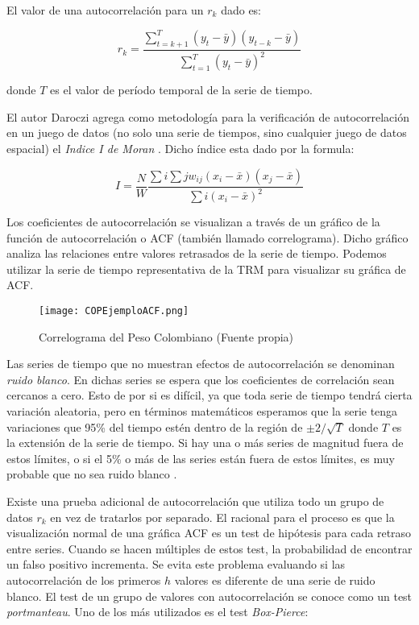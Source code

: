 El valor de una autocorrelación para un \(r_{k}\) dado es:

\[ r_{k} = \frac{\sum_{t = k + 1}^T(y_{t} - \bar{y})(y_{t - k} - \bar{y})}{\sum_{t = 1}^T(y_{t} - \bar{y})^{2}} \]

donde \(T\) es el valor de período temporal de la serie de tiempo. 

El autor Daroczi agrega como metodología para la verificación de autocorrelación en un juego de datos (no solo una serie de tiempos, sino cualquier juego de datos espacial) el \emph{Indice I de Moran} \cite{daroczi}. Dicho índice esta dado por la formula:

\[ I = \frac{N}{W} 
	\frac{\sum{i}\sum{j}w_{ij}(x_{i} - \bar{x})(x_{j} - \bar{x})}{{\sum{i}(x_{i} - \bar{x})^2}} \]

Los coeficientes de autocorrelación se visualizan a través de un gráfico de la función de autocorrelación o ACF (también llamado correlograma). Dicho gráfico analiza las relaciones entre valores retrasados de la serie de tiempo. Podemos utilizar la serie de tiempo representativa de la TRM para visualizar su gráfica de ACF.

\begin{figure}[h!]
    \centering
    \texttt{[image: COPEjemploACF.png]}
    \caption{Correlograma del Peso Colombiano (Fuente propia)}
\end{figure}

Las series de tiempo que no muestran efectos de autocorrelación se denominan \emph{ruido blanco}. En dichas series se espera que los coeficientes de correlación sean cercanos a cero. Esto de por si es difícil, ya que toda serie de tiempo tendrá cierta variación aleatoria, pero en términos matemáticos esperamos que la serie tenga variaciones que 95\% del tiempo estén dentro de la región de $\pm2/\sqrt{T}$ donde $T$ es la extensión de la serie de tiempo. Si hay una o más series de magnitud fuera de estos límites, o si el 5\% o más de las series están fuera de estos límites, es muy probable que no sea ruido blanco \cite{hyndman}.

Existe una prueba adicional de autocorrelación que utiliza todo un grupo de datos $r_k$ en vez de tratarlos por separado. El racional para el proceso es que la visualización normal de una gráfica ACF es un test de hipótesis para cada retraso entre series. Cuando se hacen múltiples de estos test, la probabilidad de encontrar un falso positivo incrementa. Se evita este problema evaluando si las autocorrelación de los primeros $h$ valores es diferente de una serie de ruido blanco. El test de un grupo de valores con autocorrelación se conoce como un test \emph{portmanteau}. Uno de los más utilizados es el test \emph{Box-Pierce}:


